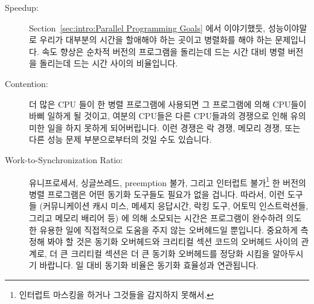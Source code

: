 \begin{description}
\item[Speedup:]  Section~\ref{sec:intro:Parallel Programming Goals} 에서
	이야기했듯, 성능이야말로 우리가 대부분의 시간을 할애해야 하는 곳이고
	병렬화를 해야 하는 문제입니다.
	속도 향상은 순차적 버전의 프로그램을 돌리는데 드는 시간 대비 병렬
	버전을 돌리는데 드는 시간 사이의 비율입니다.
\item[Contention:]  더 많은 CPU 들이 한 병렬 프로그램에 사용되면 그 프로그램에
	의해 CPU들이 바삐 일하게 될 것이고, 여분의 CPU들은 다른 CPU들과의
	경쟁으로 인해 유의미한 일을 하지 못하게 되어버립니다.
	이런 경쟁은 락 경쟁, 메모리 경쟁, 또는 다른 성능 문제 부분으로부터의
	것일 수도 있습니다.
\iffalse

\item[Speedup:]  As noted in
	Section~\ref{sec:intro:Parallel Programming Goals},
	increased performance is the major reason
	to go to all of the time and trouble
	required to parallelize it.
	Speedup is defined to be the ratio of the time required
	to run a sequential version of the program to the time
	required to run a parallel version.
\item[Contention:]  If more CPUs are applied to a parallel
	program than can be kept busy by that program,
	the excess CPUs are prevented from doing
	useful work by contention.
	This may be lock contention, memory contention, or a host
	of other performance killers.
\fi
\item[Work-to-Synchronization Ratio:]  유니프로세서, 싱글쓰레드, preemption
	불가, 그리고 인터럽트 불가\footnote{
		인터럽트 마스킹을 하거나 그것들을 감지하지 못해서.}
	한 버전의 병렬 프로그램은 어떤 동기화 도구들도 필요가 없을 겁니다.
	따라서, 이런 도구들 (커뮤니케이션 캐시 미스, 메세지 응답시간, 락킹
	도구, 어토믹 인스트럭션들, 그리고 메모리 배리어 등) 에 의해 소모되는
	시간은 프로그램이 완수하려 의도한 유용한 일에 직접적으로 도움을 주지
	않는 오버헤드일 뿐입니다.
	중요하게 측정해 봐야 할 것은 동기화 오버헤드와 크리티컬 섹션 코드의
	오버헤드 사이의 관계로, 더 큰 크리티컬 섹션은 더 큰 동기화 오버헤드를
	정당화 시킴을 알아두시기 바랍니다.
	일 대비 동기화 비율은 동기화 효율성과 연관됩니다.
\iffalse


\end{description}
